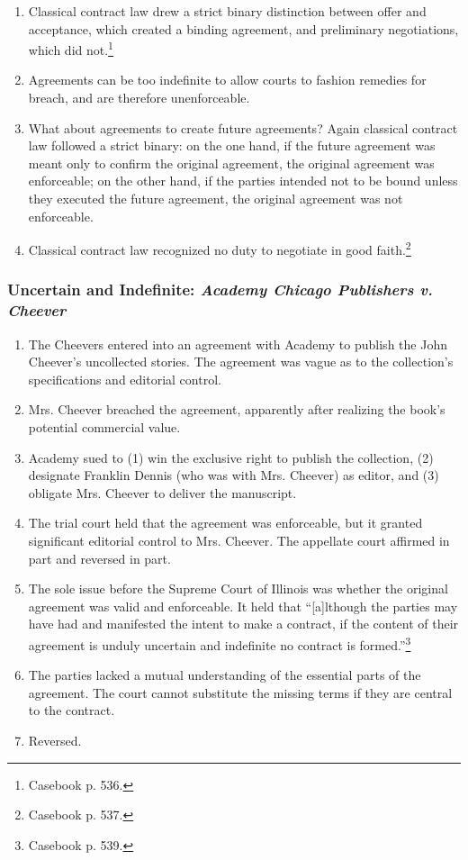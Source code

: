 \begin{enumerate}
    \item Classical contract law drew a strict binary distinction between 
    offer and acceptance, which created a binding agreement, and preliminary 
    negotiations, which did not.\footnote{Casebook p. 536.}
    \item Agreements can be too indefinite to allow courts to fashion 
    remedies for breach, and are therefore unenforceable.
    \item What about agreements to create future agreements? Again classical 
    contract law followed a strict binary: on the one hand, if the future
    agreement was meant only to confirm the original agreement, the original 
    agreement was enforceable; on the other hand, if the parties intended not 
    to be bound unless they executed the future agreement, the original 
    agreement was not enforceable.
    \item Classical contract law recognized no duty to negotiate in good 
    faith.\footnote{Casebook p. 537.}
\end{enumerate}

\subsubsection{Uncertain and Indefinite: \emph{Academy Chicago Publishers v. 
Cheever}}

\begin{enumerate}
    \item The Cheevers entered into an agreement with Academy to publish the 
    John Cheever's uncollected stories. The agreement was vague as to the 
    collection's specifications and editorial control.
    \item Mrs. Cheever breached the agreement, apparently after realizing the 
    book's potential commercial value.
    \item Academy sued to (1) win the exclusive right to publish the 
    collection, (2) designate Franklin Dennis (who was with Mrs. Cheever) as 
    editor, and (3) obligate Mrs. Cheever to deliver the manuscript.
    \item The trial court held that the agreement was enforceable, but it 
    granted significant editorial control to Mrs. Cheever. The appellate court 
    affirmed in part and reversed in part.
    \item The sole issue before the Supreme Court of Illinois was whether the 
    original agreement was valid and enforceable. It held that ``[a]lthough 
    the parties may have had and manifested the intent to make a contract, if 
    the content of their agreement is unduly uncertain and indefinite no 
    contract is formed.''\footnote{Casebook p. 539.}
    \item The parties lacked a mutual understanding of the essential parts of 
    the agreement. The court cannot substitute the missing terms if they are 
    central to the contract.
    \item Reversed.
\end{enumerate}

